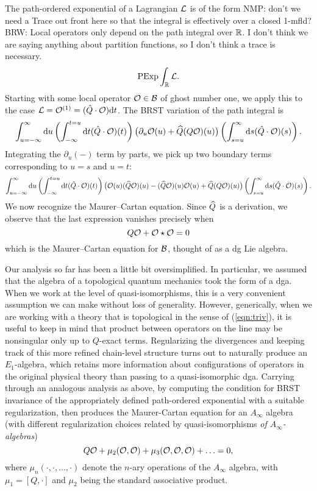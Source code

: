 \documentclass[11pt]{amsart}
\def\brian#1{{\textcolor{blue!65!red}{BRW: {#1}}}}
\def\natalie#1{{\textcolor{green!65!black}{NMP: {#1}}}}
\begin{document}
The path-ordered exponential of a Lagrangian $\cL$ is of the form \natalie{don't we need a Trace out front here so that the integral is effectively over a closed 1-mfld?}
\brian{Local operators only depend on the path integral over $\RR$.
I don't think we are saying anything about partition functions, so I don't think a trace is necessary.} 
\[
\text{PExp} \int_\RR \cL .
\]
Starting with some local operator $\cO \in \cB$ of ghost number one, we apply this to the case $\cL = \cO^{(1)} = (\hat{Q} \cdot \cO) \d t$.
The BRST variation of the path integral is
\[
\int_{u=-\infty}^\infty \d u \left( \int_{-\infty}^{t = u} \d t (\hat{Q} \cdot \cO) (t) \right) \big(\partial_u \cO(u) + \Hat{Q} (Q \cO)(u) \big) \left( \int_{s=u}^{\infty} \d s (\hat{Q} \cdot \cO) (s) \right) .
\]
Integrating the $\partial_u(-)$ term by parts, we pick up two boundary terms corresponding to $u=s$ and $u=t$:
\[
\int_{u=-\infty}^\infty \d u \left( \int_{-\infty}^{t = u} \d t (\hat{Q} \cdot \cO) (t) \right) \big(\cO (u) (\Hat{Q}\cO) (u) - (\Hat{Q}\cO) (u) \cO (u) + \Hat{Q} (Q \cO)(u) \big) \left( \int_{s=u}^{\infty} \d s (\hat{Q} \cdot \cO) (s) \right) .
\]
We now recognize the Maurer--Cartan equation. 
Since $\Hat{Q}$ is a derivation, we observe that the last expression vanishes precisely when
\[
Q \cO + \cO \star \cO = 0 
\]
which is the Maurer--Cartan equation for $\cB$, thought of as a dg Lie algebra. 

Our analysis so far has been a little bit oversimplified. In particular, we assumed that the algebra of a topological quantum mechanics took the form of a dga. When we work at the level of quasi-isomorphisms, this is a very convenient assumption we can make without loss of generality. However, generically, when we are working with a theory that is topological in the sense of (\ref{eqn:triv}), it is useful to keep in mind that product between operators on the line may be nonsingular only up to $Q$-exact terms. Regularizing the divergences and keeping track of this more refined chain-level structure turns out to naturally produce an $E_1$-algebra, which retains more information about configurations of operators in the original physical theory than passing to a quasi-isomorphic dga. Carrying through an analogous analysis as above, by computing the condition for BRST invariance of the appropriately defined path-ordered exponential with a suitable regularization, then produces the Maurer-Cartan equation for an $A_{\infty}$ algebra (with different regularization choices related by quasi-isomorphisms \textit{of $A_{\infty}$-algebras})
\[
Q \cO + \mu_2(\cO, \cO) + \mu_3(\cO, \cO, \cO) + \ldots = 0,
\]
where $\mu_n(\cdot, \cdot, \ldots, \cdot)$ denote the $n$-ary operations of the $A_{\infty}$ algebra, with $\mu_1 = [Q, \cdot]$ and $\mu_2$ being the standard associative product.  
\end{document}
